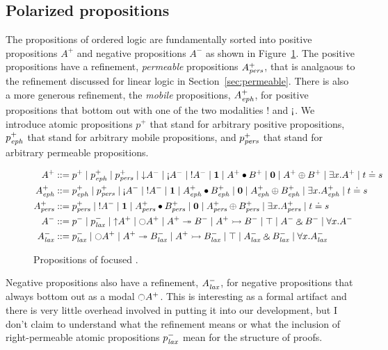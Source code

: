 \subsection{Polarized propositions}

The propositions of ordered logic are fundamentally sorted into
positive propositions $A^+$ and negative propositions $A^-$
as shown in Figure~\ref{fig:ordered}. The
positive propositions have a refinement, {\it permeable} propositions
$A^+_{\it pers}$, that is analgaous to the refinement discussed for linear
logic in Section~\ref{sec:permeable}. There is also a more generous
refinement, the {\it mobile} propositions, $A^+_{\it eph}$, for positive
propositions that bottom out with one of the two modalities ${!}$ and
${\gnab}$. We introduce atomic propositions $p^+$ that stand for
arbitrary positive propositions, $p^+_{\it eph}$ that stand for arbitrary
mobile propositions, and $p^+_{\it pers}$ that stand for arbitrary
permeable propositions.

\begin{figure}
\begin{align*}
A^+ & ::= p^+ \mid p^+_\meph \mid p^+_\mpers
        \mid {\downarrow}A^- \mid {\gnab}A^- \mid {!}A^- 
        \mid \one \mid A^+ \fuse B^+ \mid \zero \mid A^+ \oplus B^+ 
        \mid \exists x. A^+ \mid t \doteq s
\\
A^+_\meph & ::= p^+_\meph \mid p^+_\mpers
        \mid {\gnab}A^- \mid {!}A^- 
        \mid \one \mid A^+_\meph \fuse B^+_\meph
        \mid \zero \mid A^+_\meph \oplus B^+_\meph
        \mid \exists x. A^+_\meph \mid t \doteq s
\\
A^+_\mpers & ::= p^+_\mpers 
        \mid {!}A^- 
        \mid \one \mid A^+_\mpers \fuse B^+_\mpers 
        \mid \zero \mid A^+_\mpers \oplus B^+_\mpers
        \mid \exists x. A^+_\mpers \mid t \doteq s
\\
A^- & ::= p^- \mid p^-_\mlax 
        \mid {\uparrow}A^+ \mid {\ocircle}A^+
        \mid A^+ \righti B^- \mid A^+ \lefti B^-
        \mid \top \mid A^- \with B^-
        \mid \forall x.A^-
\\
A^-_\mlax & ::= p^-_\mlax 
        \mid {\ocircle}A^+
        \mid A^+ \righti B^-_\mlax \mid A^+ \lefti B^-_\mlax
        \mid \top \mid A^-_\mlax \with B^-_\mlax
        \mid \forall x.A^-_\mlax
\end{align*}
\caption{Propositions of focused \ollll.}
\label{fig:ordered}
\end{figure}

Negative propositions also have a refinement, $A^-_{\it lax}$, for
negative propositions that always bottom out as a modal
${\ocircle}A^+$.  This is interesting as a formal artifact and there
is very little overhead involved in putting it into our development,
but I don't claim to understand what the refinement means or what the
inclusion of right-permeable atomic propositions $p^-_{\it lax}$ mean for
the structure of proofs.

